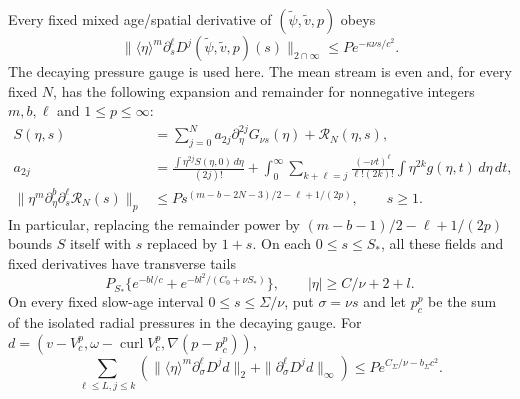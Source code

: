 \begin{lemma}
\label{sct:heat}
Every fixed mixed age/spatial derivative of
$(\widetilde\psi,\widetilde v,p)$ obeys
\begin{equation}
 \|\langle\eta\rangle^m\partial_s^\ell D^j
       (\widetilde\psi,\widetilde v,p)(s)\|_{2\cap\infty}
       \leq P e^{-\kappa\nu s/c^2}. \label{sct:fluctuation}
\end{equation}
The decaying pressure gauge is used here. The mean stream is even and,
for every fixed $N$, has the following expansion and remainder for
nonnegative integers $m,b,\ell$ and $1\leq p\leq\infty$:
\begin{align}
 S(\eta,s)&=\sum_{j=0}^Na_{2j}\partial_\eta^{2j}G_{\nu s}(\eta)
                         +\mathcal R_N(\eta,s),\\
 a_{2j}&=\frac{\int\eta^{2j}S(\eta,0)\,d\eta}{(2j)!}
 +\int_0^\infty\sum_{k+\ell=j}
 \frac{(-\nu t)^\ell}{\ell!(2k)!}
          \int\eta^{2k}g(\eta,t)\,d\eta\,dt,\\
 \|\eta^m\partial_\eta^b\partial_s^\ell\mathcal R_N(s)\|_p
 &\leq P s^{(m-b-2N-3)/2-\ell+1/(2p)},\qquad s\geq1.
 \label{sct:expansion}
\end{align}
In particular, replacing the remainder power by
$(m-b-1)/2-\ell+1/(2p)$ bounds $S$ itself with $s$ replaced by $1+s$.
On each $0\leq s\leq S_*$, all these fields and fixed derivatives have
transverse tails
\begin{equation}
 P_{S_*}\{e^{-b l/c}+e^{-b l^2/(C_0+\nu S_*)}\},\qquad
 |\eta|\geq C/\nu+2+l. \label{sct:transverse}
\end{equation}
On every fixed slow-age interval $0\leq s\leq\Sigma/\nu$, put
$\sigma=\nu s$ and let $p_c^p$ be the sum of the isolated radial
pressures in the decaying gauge. For
$d=(v-V_c^p,\omega-\operatorname{curl}V_c^p,\nabla(p-p_c^p))$,
\begin{equation}
 \sum_{\ell\leq L,j\leq k}
 \left(\|\langle\eta\rangle^m\partial_\sigma^\ell D^jd\|_2
              +\|\partial_\sigma^\ell D^jd\|_\infty\right)
 \leq P e^{C_\Sigma/\nu-b_\Sigma c^2}.
 \label{sct:fixed-band}
\end{equation}
\end{lemma}

